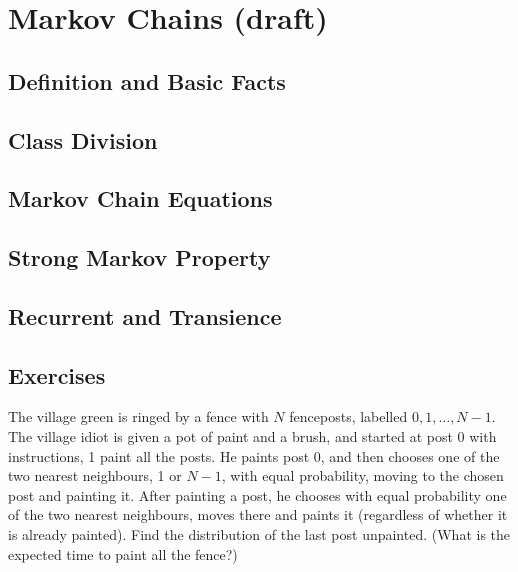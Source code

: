 \chapter{Markov Chains (draft)}

\section{Definition and Basic Facts}

\section{Class Division}

\section{Markov Chain Equations}

\section{Strong Markov Property}

\section{Recurrent and Transience}












\section{Exercises}

\begin{problem}
The village green is ringed by a fence with $N$ fenceposts, labelled $0,1,\dots,N-1$. The village idiot is given a pot of paint and a brush, and started at post 0 with instructions, 1 paint all the posts. He paints post 0, and then chooses one of the two nearest neighbours, 1 or $N-1$, with equal probability, moving to the chosen post and painting it. After painting a post, he chooses with equal probability one of the two nearest neighbours, moves there and paints it (regardless of whether it is already painted). Find the distribution of the last post unpainted. (What is the expected time to paint all the fence?)
\end{problem}

